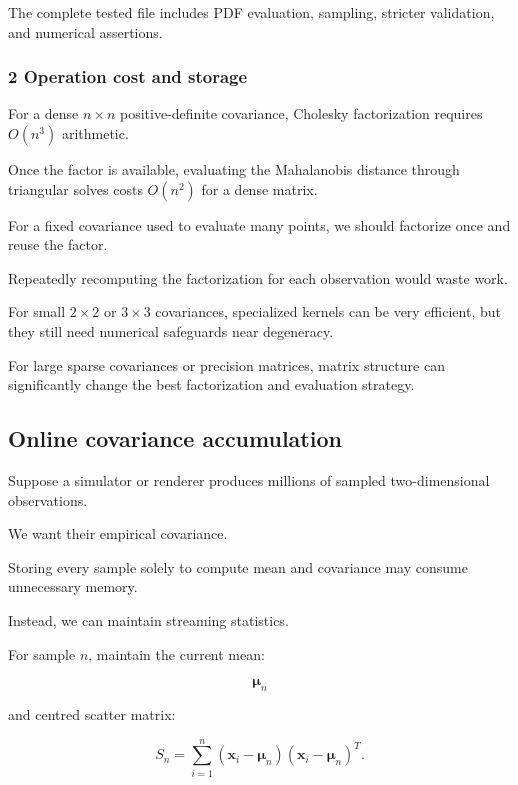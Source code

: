 The complete tested file includes PDF evaluation, sampling, stricter validation, and numerical assertions.

\subsubsection{2 Operation cost and storage}\label{02-foundations-ii-ch031-operation-cost-and-storage}

\hypertarget{02-foundations-ii-ch031-operation-cost-and-storage}{}

For a dense \(n\times n\) positive-definite covariance, Cholesky factorization requires \(O(n^3)\) arithmetic.

Once the factor is available, evaluating the Mahalanobis distance through triangular solves costs \(O(n^2)\) for a dense matrix.

For a fixed covariance used to evaluate many points, we should factorize once and reuse the factor.

Repeatedly recomputing the factorization for each observation would waste work.

For small \(2\times2\) or \(3\times3\) covariances, specialized kernels can be very efficient, but they still need numerical safeguards near degeneracy.

For large sparse covariances or precision matrices, matrix structure can significantly change the best factorization and evaluation strategy.

\subsection{Online covariance accumulation}\label{02-foundations-ii-ch031-online-covariance-accumulation}

\hypertarget{02-foundations-ii-ch031-online-covariance-accumulation}{}

Suppose a simulator or renderer produces millions of sampled two-dimensional observations.

We want their empirical covariance.

Storing every sample solely to compute mean and covariance may consume unnecessary memory.

Instead, we can maintain streaming statistics.

For sample \(n\), maintain the current mean:

\[
 \boldsymbol\mu_n
\]

and centred scatter matrix:

\[
 S_n= \sum_{i=1}^{n} (\mathbf x_i-\boldsymbol\mu_n) (\mathbf x_i-\boldsymbol\mu_n)^T.
\]

